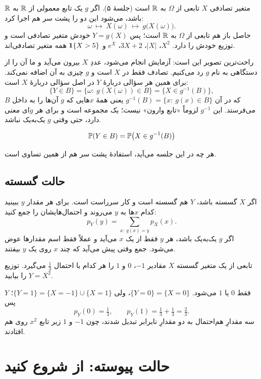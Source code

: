 متغیر تصادفی $X$ تابعی از $\Omega$ به $\R$ است (جلسهٔ ۵). اگر $g$ یک تابع معمولی از $\R$ به $\R$ باشد، می‌شود این دو را پشت سر هم اجرا کرد:
\[ \omega\ \longmapsto\ X(\omega)\ \longmapsto\ g\bigl(X(\omega)\bigr). \]
حاصل باز هم تابعی از $\Omega$ به $\R$ است؛ پس $Y=g(X)$ خودش متغیر تصادفی است و توزیع خودش را دارد. $X^2$، $|X|$، $3X+2$، $e^X$ و $\ind\{X>5\}$ همه متغیر تصادفی‌اند.

راحت‌ترین تصویر این است: آزمایش انجام می‌شود، عددِ $X$ بیرون می‌آید و ما آن را از دستگاهی به نام $g$ رد می‌کنیم. تصادف فقط در $X$ است و $g$ چیزی به آن اضافه نمی‌کند. برای همین هر سؤالی دربارهٔ $Y$ در اصل سؤالی دربارهٔ $X$ است:
\[ \{Y\in B\}=\bigl\{\omega:\ g(X(\omega))\in B\bigr\}=\bigl\{X\in g^{-1}(B)\bigr\}, \]
که در آن $g^{-1}(B)=\{x:\ g(x)\in B\}$ یعنی همهٔ $x$هایی که $g$ آن‌ها را به داخل $B$ می‌فرستد. این $g^{-1}$ لزوماً «تابع وارون» نیست؛ یک مجموعه است و برای هر $g$ای معنی دارد، حتی وقتی $g$ یک‌به‌یک نباشد.

\begin{keyformula}
\[ \P(Y\in B)=\P\bigl(X\in g^{-1}(B)\bigr) \]
\end{keyformula}

هر چه در این جلسه می‌آید، استفادهٔ پشت سر هم از همین تساوی است.

\subsection{حالت گسسته}

اگر $X$ گسسته باشد، $Y$ هم گسسته است و کار سرراست است. برای هر مقدار $y$ ببینید کدام $x$ها به $y$ می‌روند و احتمال‌هایشان را جمع کنید:
\[ p_Y(y)=\sum_{x:\ g(x)=y}p_X(x). \]
اگر $g$ یک‌به‌یک باشد، هر $y$ فقط از یک $x$ می‌آید و عملاً فقط اسم مقدارها عوض می‌شود. جمع وقتی پیش می‌آید که چند $x$ روی یک $y$ بیفتند.

\begin{example}[label=ex:func-disc]{تابعی از یک متغیر گسسته}
$X$ مقادیر $-1$، $0$ و $1$ را هر کدام با احتمال $\tfrac13$ می‌گیرد. توزیع $Y=X^2$ را بیابید.
\begin{solution}
$Y$ فقط $0$ یا $1$ می‌شود. $\{Y=0\}=\{X=0\}$، ولی $\{Y=1\}=\{X=-1\}\cup\{X=1\}$؛ پس
\[ p_Y(0)=\tfrac13,\qquad p_Y(1)=\tfrac13+\tfrac13=\tfrac23. \]
سه مقدارِ هم‌احتمال به دو مقدارِ نابرابر تبدیل شدند، چون $-1$ و $1$ زیر تابع $x^2$ روی هم افتادند.
\end{solution}
\end{example}

\section{حالت پیوسته: از  شروع کنید}
\label{sec:cdf-method}

